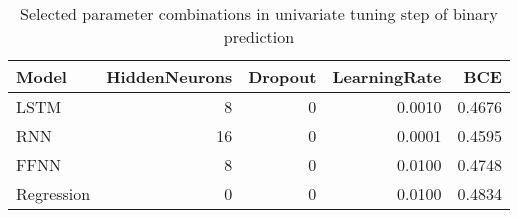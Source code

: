 \begin{table}[h!]
\centering
 \begin{adjustbox}{max width=\textwidth}
\begin{tabular}{lrrrr}
  \hline
Model & HiddenNeurons & Dropout & LearningRate & BCE \\ 
  \hline
LSTM &     8 &     0 & 0.0010 & 0.4676 \\ 
  RNN &    16 &     0 & 0.0001 & 0.4595 \\ 
  FFNN &     8 &     0 & 0.0100 & 0.4748 \\ 
  Regression &     0 &     0 & 0.0100 & 0.4834 \\ 
   \hline
 \end{tabular}
\end{adjustbox}
\caption{Selected parameter combinations in univariate tuning step of binary prediction} 
\label{tab:binary.par.tuning.short}
\end{table}

